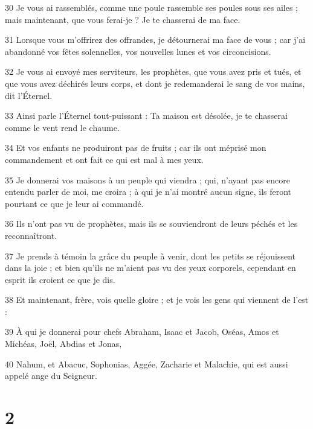 \par 30 Je vous ai rassemblés, comme une poule rassemble ses poules sous ses ailes ; mais maintenant, que vous ferai-je ? Je te chasserai de ma face.
\par 31 Lorsque vous m'offrirez des offrandes, je détournerai ma face de vous ; car j'ai abandonné vos fêtes solennelles, vos nouvelles lunes et vos circoncisions.
\par 32 Je vous ai envoyé mes serviteurs, les prophètes, que vous avez pris et tués, et que vous avez déchirés leurs corps, et dont je redemanderai le sang de vos mains, dit l'Éternel.
\par 33 Ainsi parle l'Éternel tout-puissant : Ta maison est désolée, je te chasserai comme le vent rend le chaume.
\par 34 Et vos enfants ne produiront pas de fruits ; car ils ont méprisé mon commandement et ont fait ce qui est mal à mes yeux.
\par 35 Je donnerai vos maisons à un peuple qui viendra ; qui, n'ayant pas encore entendu parler de moi, me croira ; à qui je n'ai montré aucun signe, ils feront pourtant ce que je leur ai commandé.
\par 36 Ils n'ont pas vu de prophètes, mais ils se souviendront de leurs péchés et les reconnaîtront.
\par 37 Je prends à témoin la grâce du peuple à venir, dont les petits se réjouissent dans la joie ; et bien qu'ils ne m'aient pas vu des yeux corporels, cependant en esprit ils croient ce que je dis.
\par 38 Et maintenant, frère, vois quelle gloire ; et je vois les gens qui viennent de l'est :
\par 39 À qui je donnerai pour chefs Abraham, Isaac et Jacob, Oséas, Amos et Michéas, Joël, Abdias et Jonas,
\par 40 Nahum, et Abacuc, Sophonias, Aggée, Zacharie et Malachie, qui est aussi appelé ange du Seigneur.

\chapter{2}

